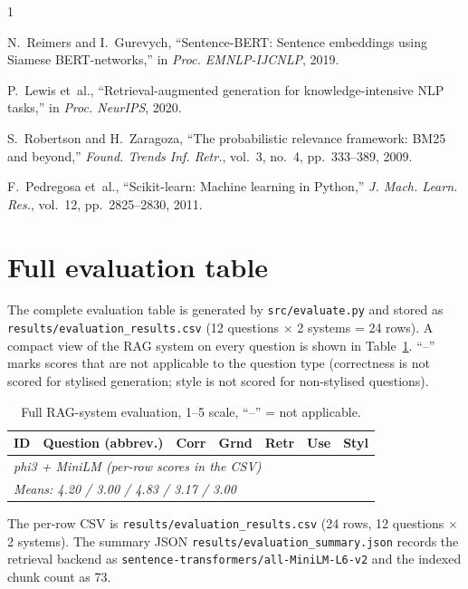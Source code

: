 \documentclass[10pt,twocolumn,a4paper]{article}
\begin{document}
\begin{thebibliography}{1}

N.~Reimers and I.~Gurevych, ``Sentence-BERT: Sentence embeddings using
Siamese BERT-networks,'' in \emph{Proc. EMNLP-IJCNLP}, 2019.

P.~Lewis et~al., ``Retrieval-augmented generation for
knowledge-intensive NLP tasks,'' in \emph{Proc. NeurIPS}, 2020.

S.~Robertson and H.~Zaragoza, ``The probabilistic relevance framework:
BM25 and beyond,'' \emph{Found. Trends Inf. Retr.}, vol.~3, no.~4,
pp.~333--389, 2009.

F.~Pedregosa et~al., ``Scikit-learn: Machine learning in Python,''
\emph{J. Mach. Learn. Res.}, vol.~12, pp.~2825--2830, 2011.

\end{thebibliography}

\appendices

\section{Full evaluation table}
\label{app:evaluation}

The complete evaluation table is generated by
\verb|src/evaluate.py| and stored as
\verb|results/evaluation_results.csv| (12 questions $\times$ 2 systems
= 24 rows). A compact view of the RAG system on every question is
shown in Table~\ref{tab:full-eval-rag}. ``--'' marks scores that are
not applicable to the question type (correctness is not scored for
stylised generation; style is not scored for non-stylised questions).

\begin{table}[h]
\centering
\caption{Full RAG-system evaluation, 1--5 scale, ``--'' = not applicable.}
\label{tab:full-eval-rag}
\small
\begin{tabularx}{\linewidth}{lXccccc}
\toprule
ID & Question (abbrev.) & Corr & Grnd & Retr & Use & Styl \\
\midrule
\multicolumn{7}{l}{\emph{phi3 + MiniLM (per-row scores in the CSV)}} \\
\multicolumn{7}{l}{\emph{Means: 4.20 / 3.00 / 4.83 / 3.17 / 3.00}} \\
\bottomrule
\end{tabularx}

The per-row CSV is \verb|results/evaluation_results.csv| (24 rows,
12 questions $\times$ 2 systems). The summary JSON
\verb|results/evaluation_summary.json| records the retrieval backend
as \texttt{sentence-transformers/all-MiniLM-L6-v2} and the indexed
chunk count as 73.
\end{table}
\end{document}
